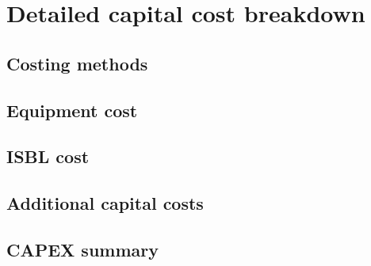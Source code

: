 \section{Detailed capital cost breakdown}
\subsection{Costing methods}
\subsection{Equipment cost}
\subsection{ISBL cost}
\subsection{Additional capital costs}
\subsection{CAPEX summary}